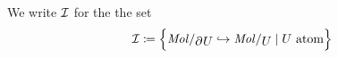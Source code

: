 

\begin{dfn}
    We write \( \mathcal{I} \) for the the set
    \begin{equation*}
        \Icof \eqdef \set{\molecin{\bd{}{}U} \incl \molecin{U} \mid U \text{ atom}}
    \end{equation*}
\end{dfn}


